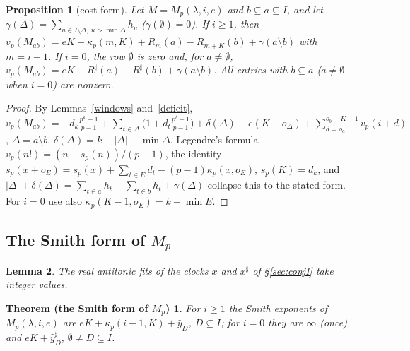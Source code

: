 \documentclass[10pt]{article}
\theoremstyle{ds}
\newtheorem{lemma}{Lemma}
\newtheorem{proposition}[lemma]{Proposition}
\newtheorem*{thmSmith}{Theorem (the Smith form of $M_p$)}
\theoremstyle{dsrem}
\begin{document}
\begin{proposition}[cost form]\label{costform}
Let $M=M_p(\lambda,i,e)$ and $b\subseteq a\subseteq I$, and let $\gamma(\Delta)=\sum_{u\in I\setminus\Delta,\ u>\min\Delta}h_u$ ($\gamma(\emptyset)=0$). If $i\ge1$, then $v_p(M_{ab})=eK+\kappa_p(m,K)+R_m(a)-R_{m+K}(b)+\gamma(a\setminus b)$ with $m=i-1$. If $i=0$, the row $\emptyset$ is zero and, for $a\ne\emptyset$, $v_p(M_{ab})=eK+R^\sharp(a)-R^\sharp(b)+\gamma(a\setminus b)$. All entries with $b\subseteq a$ ($a\ne\emptyset$ when $i=0$) are nonzero.
\end{proposition}

\begin{proof}
By Lemmas~\ref{windows} and~\ref{deficit}, $v_p(M_{ab})=-d_k\frac{p^k-1}{p-1}+\sum_{t\in\Delta}\big(1+d_t\frac{p^t-1}{p-1}\big)+\delta(\Delta)+e(K-o_\Delta)+\sum_{d=o_a}^{o_b+K-1}v_p(i+d)$, $\Delta=a\setminus b$, $\delta(\Delta)=k-|\Delta|-\min\Delta$. Legendre's formula $v_p(n!)=(n-s_p(n))/(p-1)$, the identity $s_p(x+o_E)=s_p(x)+\sum_{t\in E}d_t-(p-1)\kappa_p(x,o_E)$, $s_p(K)=d_k$, and $|\Delta|+\delta(\Delta)=\sum_{t\in a}h_t-\sum_{t\in b}h_t+\gamma(\Delta)$ \cite[Lemma~5.1]{DST} collapse this to the stated form. For $i=0$ use also $\kappa_p(K-1,o_E)=k-\min E$.
\end{proof}

\subsection{The Smith form of $M_p$}

\begin{lemma}\label{integral}
The real antitonic fits of the clocks $x$ and $x^\sharp$ of \S\ref{sec:conjI} take integer values.
\end{lemma}

\begin{thmSmith}
For $i\ge1$ the Smith exponents of $M_p(\lambda,i,e)$ are $eK+\kappa_p(i-1,K)+\hat y_D$, $D\subseteq I$; for $i=0$ they are $\infty$ (once) and $eK+\hat y^\sharp_D$, $\emptyset\ne D\subseteq I$.
\end{thmSmith}
\end{document}
